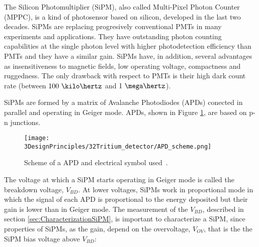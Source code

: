 The Silicon Photomultiplier (SiPM), also called Multi-Pixel Photon Counter (MPPC), is a kind of photosensor based on silicon, developed in the last two decades. SiPMs are replacing progresively conventional PMTs in many experiments and applications. They have outstanding photon counting capabilities at the single photon level with higher photodetection efficiency than PMTs and they have a similar gain. SiPMs have, in addition, several advantages as insensitiveness to magnetic fields, low operating voltage, compactness and ruggedness. The only drawback with respect to PMTs is their high dark count rate (between $100~\kilo\hertz$ and $1~\mega\hertz$).

SiPMs are formed by a matrix of Avalanche Photodiodes (APDs) conected in parallel and operating in Geiger mode. APDs, shown in Figure \ref{fig:SchemeAPD}, are based on p-n junctions. %

\begin{figure}[htbp]
\centering
\texttt{[image: 3DesignPrinciples/32Tritium\_detector/APD\_scheme.png]}
\caption{Scheme of a APD and electrical symbol used\label{fig:SchemeAPD}~\cite{OSI}.}
\end{figure}
 The voltage at which a SiPM starts operating in Geiger mode is called the breakdown voltage, $V_ {BD}$. At lower voltages, SiPMs work in proportional mode in which the signal of each APD is proportional to the energy deposited but their gain is lower than in Geiger mode. The measurement of the $V_ {BD}$, described in section \ref{sec:CharacterizationSiPM}, is important to characterize a SiPM, since properties of SiPMs, as the gain, depend on the overvoltage, $V_{OV}$, that is the the SiPM bias voltage above $V_ {BD}$:

